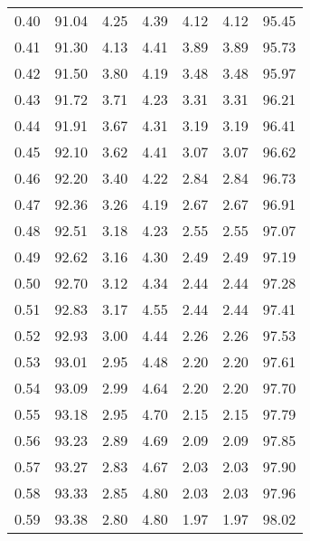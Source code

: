 \begin{tabular}{|c|c|c|c|c|c|c|}
      0.40 &     91.04 &      4.25 &       4.39 &    4.12 &       4.12 &         95.45 \\
      0.41 &     91.30 &      4.13 &       4.41 &    3.89 &       3.89 &         95.73 \\
      0.42 &     91.50 &      3.80 &       4.19 &    3.48 &       3.48 &         95.97 \\
      0.43 &     91.72 &      3.71 &       4.23 &    3.31 &       3.31 &         96.21 \\
      0.44 &     91.91 &      3.67 &       4.31 &    3.19 &       3.19 &         96.41 \\
      0.45 &     92.10 &      3.62 &       4.41 &    3.07 &       3.07 &         96.62 \\
      0.46 &     92.20 &      3.40 &       4.22 &    2.84 &       2.84 &         96.73 \\
      0.47 &     92.36 &      3.26 &       4.19 &    2.67 &       2.67 &         96.91 \\
      0.48 &     92.51 &      3.18 &       4.23 &    2.55 &       2.55 &         97.07 \\
      0.49 &     92.62 &      3.16 &       4.30 &    2.49 &       2.49 &         97.19 \\
      0.50 &     92.70 &      3.12 &       4.34 &    2.44 &       2.44 &         97.28 \\
      0.51 &     92.83 &      3.17 &       4.55 &    2.44 &       2.44 &         97.41 \\
      0.52 &     92.93 &      3.00 &       4.44 &    2.26 &       2.26 &         97.53 \\
      0.53 &     93.01 &      2.95 &       4.48 &    2.20 &       2.20 &         97.61 \\
      0.54 &     93.09 &      2.99 &       4.64 &    2.20 &       2.20 &         97.70 \\
      0.55 &     93.18 &      2.95 &       4.70 &    2.15 &       2.15 &         97.79 \\
      0.56 &     93.23 &      2.89 &       4.69 &    2.09 &       2.09 &         97.85 \\
      0.57 &     93.27 &      2.83 &       4.67 &    2.03 &       2.03 &         97.90 \\
      0.58 &     93.33 &      2.85 &       4.80 &    2.03 &       2.03 &         97.96 \\
      0.59 &     93.38 &      2.80 &       4.80 &    1.97 &       1.97 &         98.02 \\

\end{tabular}
